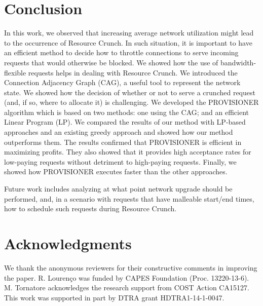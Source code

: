 \documentclass[journal]{IEEEtran}
\begin{document}
\section{Conclusion} \label{sec:conclude}

In this work, we observed that increasing average network utilization might lead to the occurrence of Resource Crunch. In such situation, it is important to have an efficient method to decide how to throttle connections to serve incoming requests that would otherwise be blocked. We showed how the use of bandwidth-flexible requests helps in dealing with Resource Crunch. We introduced the Connection Adjacency Graph (CAG), a useful tool to represent the network state. We showed how the decision of whether or not to serve a crunched request (and, if so, where to allocate it) is challenging. We developed the PROVISIONER algorithm which is based on two methods: one using the CAG; and an efficient Linear Program (LP). We compared the results of our method with LP-based approaches and an existing greedy approach and showed how our method outperforms them. The results confirmed that PROVISIONER is efficient in maximizing profits. They also showed that it provides high acceptance rates for low-paying requests without detriment to high-paying requests. Finally, we showed how PROVISIONER executes faster than the other approaches.

Future work includes analyzing at what point network upgrade should be performed, and, in a scenario with requests that have malleable start/end times, how to schedule such requests during Resource Crunch.

\section{Acknowledgments}\label{sec:Ack}

We thank the anonymous reviewers for their constructive comments in improving the paper. R. Louren\c{c}o was funded by CAPES Foundation (Proc. 13220-13-6). M. Tornatore acknowledges the research support from COST Action CA15127. This work was supported in part by DTRA grant HDTRA1-14-1-0047. 



\end{document}
